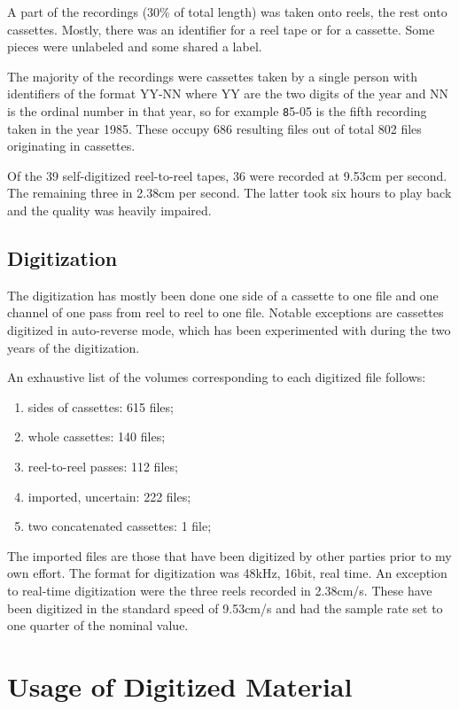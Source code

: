 A part of the recordings (30\% of total length) was taken onto reels, the rest
onto cassettes. Mostly, there was an identifier for a reel tape or for a
cassette. Some pieces were unlabeled and some shared a label.

The majority of the recordings were cassettes taken by a single person with
identifiers of the format YY-NN where YY are the two digits of the year and NN
is the ordinal number in that year, so for example {\texttt 85-05} is the fifth
recording taken in the year 1985. These occupy 686 resulting files out of
total 802 files originating in cassettes.

Of the 39 self-digitized reel-to-reel tapes, 36 were recorded at 9.53cm per
second. The remaining three in 2.38cm per second. The latter took six hours to
play back and the quality was heavily impaired.

\subsection{Digitization}

The digitization has mostly been done one side of a cassette to one file and one
channel of one pass from reel to reel to one file. Notable exceptions are
cassettes digitized in auto-reverse mode, which has been experimented with during
the two years of the digitization.

An exhaustive list of the volumes corresponding to each digitized file follows:

\begin{enumerate}
\item{sides of cassettes: 615 files;}
\item{whole cassettes: 140 files;}
\item{reel-to-reel passes: 112 files;}
\item{imported, uncertain: 222 files;}
\item{two concatenated cassettes: 1 file;}
\end{enumerate}

The imported files are those that have been digitized by other parties prior to
my own  effort. The format for digitization was 48kHz, 16bit, real time. An
exception to real-time digitization were the three reels recorded in 2.38cm/s.
These have been digitized in the standard speed of 9.53cm/s and had the sample
rate set to one quarter of the nominal value.

\section{Usage of Digitized Material}

